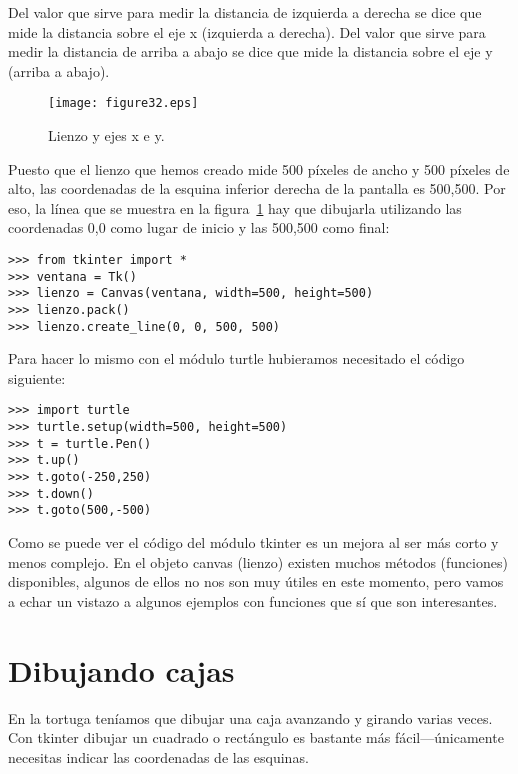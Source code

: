 Del valor que sirve para medir la distancia de izquierda a derecha se dice que mide la distancia sobre el eje x (izquierda a derecha).  Del valor que sirve para medir la distancia de arriba a abajo se dice que mide la distancia sobre el eje y (arriba a abajo).

\begin{figure}
\begin{center}
\texttt{[image: figure32.eps]}
\end{center}
\caption{Lienzo y ejes x e y.}\label{fig32}
\end{figure}

Puesto que el lienzo que hemos creado mide 500 píxeles de ancho y 500 píxeles de alto, las coordenadas de la esquina inferior derecha de la pantalla es 500,500. Por eso, la línea que se muestra en la figura~\ref{fig32} hay que dibujarla utilizando las coordenadas 0,0 como lugar de inicio y las 500,500 como final:

\begin{listing}
\begin{verbatim}
>>> from tkinter import *
>>> ventana = Tk()
>>> lienzo = Canvas(ventana, width=500, height=500)
>>> lienzo.pack()
>>> lienzo.create_line(0, 0, 500, 500)
\end{verbatim}
\end{listing}

\noindent
Para hacer lo mismo con el módulo turtle hubieramos necesitado el código siguiente:

\begin{listing}
\begin{verbatim}
>>> import turtle
>>> turtle.setup(width=500, height=500)
>>> t = turtle.Pen()
>>> t.up()
>>> t.goto(-250,250)
>>> t.down()
>>> t.goto(500,-500)
\end{verbatim}
\end{listing}

Como se puede ver el código del módulo tkinter es un mejora al ser más corto y menos complejo. En el objeto canvas (lienzo) existen muchos métodos (funciones) disponibles, algunos de ellos no nos son muy útiles en este momento, pero vamos a echar un vistazo a algunos ejemplos con funciones que sí que son interesantes.

\section{Dibujando cajas}

En la tortuga teníamos que dibujar una caja avanzando y girando varias veces. Con tkinter dibujar un cuadrado o rectángulo es bastante más fácil---únicamente necesitas indicar las coordenadas de las esquinas.

